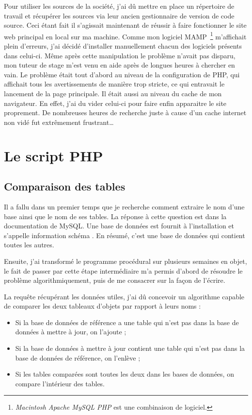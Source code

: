 Pour utiliser les sources de la société, j'ai dû mettre en place un
répertoire de travail et récupérer les sources via leur ancien
gestionnaire de version de code source. Ceci étant fait il s'agissait
maintenant de réussir à faire fonctionner le site web principal en local
sur ma machine. Comme mon logiciel MAMP\, \footnote{\emph{Macintosh
Apache MySQL PHP} est une combinaison de logiciel.} m'affichait plein
d'erreurs, j'ai décidé d'installer manuellement chacun des logiciels
présents dans celui-ci. Même après cette manipulation le problème
n'avait pas disparu, mon tuteur de stage m'est venu en aide après de
longues heures à chercher en vain. Le problème était tout d'abord au
niveau de la configuration de PHP, qui affichait tous les avertissements
de manière trop stricte, ce qui entravait le lancement de la page
principale. Il était aussi au niveau du cache de mon navigateur. En
effet, j'ai du vider celui-ci pour faire enfin apparaitre le site
proprement. De nombreuses heures de recherche juste à cause d'un cache
internet non vidé fut extrêmement frustrant\dots

\section{Le script PHP} %
\label{sec:Le script PHP}

\subsection{Comparaison des tables} %
\label{sub:Comparaison des tables}

Il a fallu dans un premier temps que je recherche comment extraire le
nom d'une base ainsi que le nom de ses tables. La réponse à cette
question est dans la documentation de MySQL. Une base de données est
fournit à l'installation et s'appelle \og information schéma \fg{} . En
résumé, c'est une base de données qui contient toutes les autres.

Ensuite, j'ai transformé le programme procédural sur plusieurs semaines
en objet, le fait de passer par cette étape intermédiaire m'a permis
d'abord de résoudre le problème algorithmiquement, puis de me consacrer
sur la façon de l'écrire.

La requête récupérant les données utiles, j'ai dû concevoir un
algorithme capable de comparer les deux tableaux d'objets par rapport à
leurs noms :

\begin{itemize}
    \item Si la base de données de référence a une table qui n'est pas
    dans la base de données à mettre à jour, on l'ajoute ;
    \item Si la base de données à mettre à jour contient une table qui
    n'est pas dans la base de données de référence, on l'enlève ;
    \item Si les tables comparées sont toutes les deux dans les bases de
    données, on compare l'intérieur des tables.
\end{itemize}

